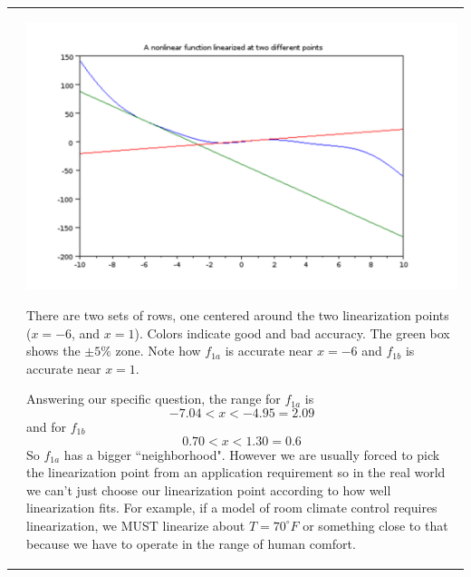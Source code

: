 \begin{Example}
\begin{tabular}{cp{}}
&

\begin{minipage}{0.45\textwidth}
\begin{center}
{\includegraphics[width=\textwidth]{figs01/linearizeattwopointsa.png}}
\end{center}

There are two sets of rows, one centered around the two linearization points ($x=-6$, and $x=1$). 
Colors indicate good and bad accuracy.  The green box shows the $\pm5\%$ zone.  Note how 
$f_{1a}$ is accurate near $x=-6$ and $f_{1b}$ is accurate near $x=1$.

Answering our specific question, the range for $f_{1a}$ is
\[
-7.04 < x < -4.95 =  2.09
\]
and for $f_{1b}$
\[
0.70 < x < 1.30 = 0.6
\]
So $f_{1a}$ has a bigger ``neighborhood".    However we are usually forced to pick the linearization point from 
an application requirement so in the real world we can't just choose our linearization point according to how well linearization fits. For example, if a model of room climate control requires linearization, we MUST linearize about $T=70^\circ F$ or something close to that because we have to operate in the range of human comfort.   
\end{minipage}

\vspace{0.35in}



\end{tabular}

\end{Example}






























